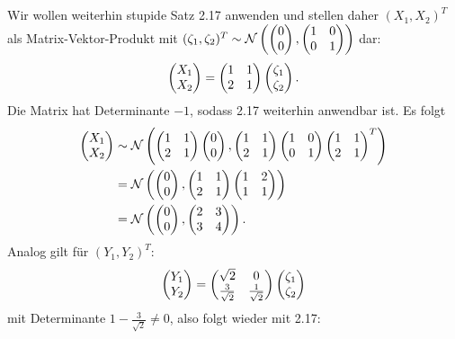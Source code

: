 \documentclass[a4paper]{article}
\begin{document}
\subsection{}

Wir wollen weiterhin stupide Satz 2.17 anwenden und stellen daher $(X_1, X_2)^T$ als Matrix-Vektor-Produkt mit $(\zeta_1, \zeta_2)^T \sim \mathcal{N}\left(\left(\begin{matrix}0 \\ 0\end{matrix}\right), \left(\begin{matrix}1 & 0 \\ 0 & 1\end{matrix}\right)\right)$ dar:
\begin{equation*}
    \left(\begin{matrix}X_1 \\ X_2\end{matrix}\right) = \left(\begin{matrix}1 & 1 \\ 2 & 1\end{matrix}\right) \left(\begin{matrix}\zeta_1\\ \zeta_2\end{matrix}\right)\text{.}
\end{equation*}
Die Matrix hat Determinante $-1$, sodass 2.17 weiterhin anwendbar ist. Es folgt
\begin{align*}
    \left(\begin{matrix}X_1 \\ X_2\end{matrix}\right) &\sim \mathcal{N} \left( \left(\begin{matrix}1 & 1 \\ 2 & 1\end{matrix}\right) \left(\begin{matrix}0 \\ 0\end{matrix}\right), \left(\begin{matrix}1 & 1 \\ 2 & 1\end{matrix}\right) \left(\begin{matrix}1 & 0 \\ 0 & 1\end{matrix}\right) \left(\begin{matrix}1 & 1 \\ 2 & 1\end{matrix}\right)^T \right)\\
    &= \mathcal{N} \left( \left(\begin{matrix}0 \\ 0\end{matrix}\right), \left(\begin{matrix}1 & 1 \\ 2 & 1\end{matrix}\right) \left(\begin{matrix}1 & 2 \\ 1 & 1\end{matrix}\right) \right)\\
    &= \mathcal{N} \left( \left(\begin{matrix}0 \\ 0\end{matrix}\right), \left(\begin{matrix}2 & 3 \\ 3 & 4\end{matrix}\right) \right)\text{.}
\end{align*}
Analog gilt für $(Y_1, Y_2)^T$:
\begin{equation*}
    \left(\begin{matrix}Y_1 \\ Y_2\end{matrix}\right) = \left(\begin{matrix}\sqrt{2} & 0 \\ \frac{3}{\sqrt{2}} & \frac{1}{\sqrt{2}}\end{matrix}\right) \left(\begin{matrix}\zeta_1 \\ \zeta_2\end{matrix}\right)
\end{equation*}
mit Determinante $1 - \frac{3}{\sqrt{2}} \neq 0$, also folgt wieder mit 2.17:
\end{document}
